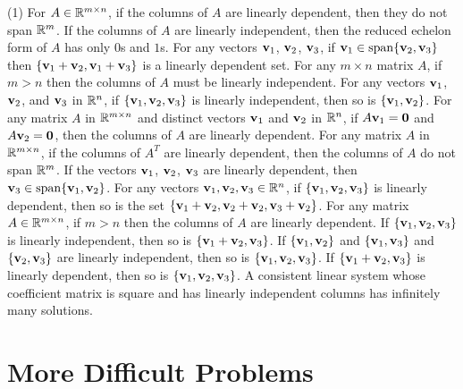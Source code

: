 \begin{tasks}[resume, style=enumerate](1)
\task
  For $A \in \mathbb R^{m \times n}$, if the columns of $A$ are linearly
  dependent, then they do not span $\mathbb R^m$.
\task
  If the columns of $A$ are linearly independent, then the reduced
  echelon form of $A$ has only $0$s and $1$s.
\task
  For any vectors $\mathbf v_1$, $\mathbf v_2$, $\mathbf v_3$, if $\mathbf v_1 \in
  \operatorname{\mathrm{span}}\{\mathbf v_2, \mathbf v_3\}$ then $\{ \mathbf v_1 + \mathbf v_2, \mathbf v_1 + \mathbf v_3\}$ is
  a linearly dependent set.
\task
  For any $m \times n$ matrix $A$, if $m > n$ then the columns of $A$
  must be linearly independent.
\task
  For any vectors $\mathbf v_1$, $\mathbf v_2$, and $\mathbf v_3$ in $\mathbb R^n$, if
  $\{\mathbf v_1, \mathbf v_2, \mathbf v_3\}$ is linearly independent, then so is
  $\{\mathbf v_1, \mathbf v_2\}$.
\task
  For any matrix $A$ in $\mathbb R^{m \times n}$ and distinct vectors
  $\mathbf v_1$ and $\mathbf v_2$ in $\mathbb R^n$, if $A\mathbf v_1 = \mathbf 0$ and
  $A\mathbf v_2 = \mathbf 0$, then the columns of $A$ are linearly dependent.
\task
  For any matrix $A$ in $\mathbb R^{m \times n}$, if the columns of $A^T$ are
  linearly dependent, then the columns of $A$ do not span $\mathbb R^m$.
\task
 If the vectors $\mathbf v_1$, $\mathbf v_2$, $\mathbf v_3$ are linearly dependent, then
 $\mathbf v_3 \in \operatorname{\mathrm{span}}\{\mathbf v_1, \mathbf v_2\}$.
\task
  For any vectors $\mathbf v_1, \mathbf v_2, \mathbf v_3 \in \mathbb R^n$, if $\{\mathbf v_1, \mathbf v_2,
  \mathbf v_3\}$ is linearly dependent, then so is the set $\{\mathbf v_1 + \mathbf v_2,
  \mathbf v_2 + \mathbf v_2, \mathbf v_3 + \mathbf v_2\}$.
\task
  For any matrix $A \in \mathbb R^{m \times n}$, if $m > n$ then the columns
  of $A$ are linearly dependent.
\task
  If $\{\mathbf v_1, \mathbf v_2, \mathbf v_3\}$ is linearly independent, then so is
  $\{\mathbf v_1 + \mathbf v_2, \mathbf v_3\}$.
\task
  If $\{\mathbf v_1, \mathbf v_2\}$ and $\{\mathbf v_1, \mathbf v_3\}$ and $\{\mathbf v_2, \mathbf v_3\}$
  are linearly independent, then so is $\{\mathbf v_1, \mathbf v_2, \mathbf v_3\}$.
\task
  If $\{\mathbf v_1 + \mathbf v_2, \mathbf v_3\}$ is linearly dependent, then so is
  $\{\mathbf v_1, \mathbf v_2, \mathbf v_3\}$.
\task
  A consistent linear system whose coefficient matrix is square and
  has linearly independent columns has infinitely many solutions.
\end{tasks}

\section{More Difficult Problems}

